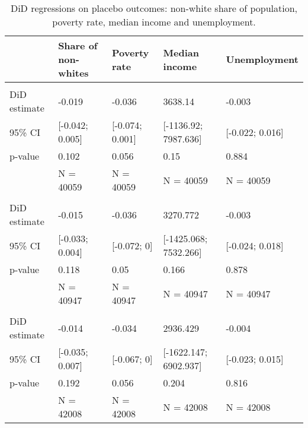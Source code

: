 \begin{table}

\caption{\label{tab:placebo-outcomes}DiD regressions on placebo outcomes: non-white share of population,
               poverty rate, median income and unemployment.}
\centering
\begin{tabular}[t]{lllll}
\toprule
 & Share of non-whites & Poverty rate & Median income & Unemployment\\
\midrule
\addlinespace[0.3em]
\multicolumn{5}{l}{\textbf{Group 1}}\\
\hspace{1em}DiD estimate & -0.019 & -0.036 & 3638.14 & -0.003\\
\hspace{1em}95\% CI & {}[-0.042; 0.005] & {}[-0.074; 0.001] & {}[-1136.92; 7987.636] & {}[-0.022; 0.016]\\
\hspace{1em}p-value & 0.102 & 0.056 & 0.15 & 0.884\\
\hspace{1em} & N = 40059 & N = 40059 & N = 40059 & N = 40059\\
\addlinespace[0.3em]
\multicolumn{5}{l}{\textbf{Group 2}}\\
\hspace{1em}DiD estimate & -0.015 & -0.036 & 3270.772 & -0.003\\
\hspace{1em}95\% CI & {}[-0.033; 0.004] & {}[-0.072; 0] & {}[-1425.068; 7532.266] & {}[-0.024; 0.018]\\
\hspace{1em}p-value & 0.118 & 0.05 & 0.166 & 0.878\\
\hspace{1em} & N = 40947 & N = 40947 & N = 40947 & N = 40947\\
\addlinespace[0.3em]
\multicolumn{5}{l}{\textbf{Group 3}}\\
\hspace{1em}DiD estimate & -0.014 & -0.034 & 2936.429 & -0.004\\
\hspace{1em}95\% CI & {}[-0.035; 0.007] & {}[-0.067; 0] & {}[-1622.147; 6902.937] & {}[-0.023; 0.015]\\
\hspace{1em}p-value & 0.192 & 0.056 & 0.204 & 0.816\\
\hspace{1em} & N = 42008 & N = 42008 & N = 42008 & N = 42008\\
\bottomrule
\end{tabular}
\end{table}
